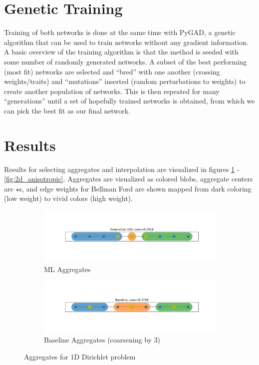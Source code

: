 \documentclass{article}
\begin{document}
\section{Genetic Training}
Training of both networks is done at the same time with PyGAD\cite{gad2021pygad}, a genetic algorithm that can be used to train networks without any gradient information.  A basic overview of the training algorithm is that the method is seeded with some number of randomly generated networks. A subset of the best performing (most fit) networks are selected and ``bred'' with one another (crossing weights/traits) and ``mutations'' inserted (random perturbations to weights) to create another population of networks.  This is then repeated for many ``generations'' until a set of hopefully trained networks is obtained, from which we can pick the best fit as our final network.

\section{Results}
Results for selecting aggregates and interpolation are visualized in figures \ref{fig:1d_dirichlet} - \ref{fig:2d_anisotropic}.  Aggregates are visualized as colored blobs, aggregate centers are $\star$s, and edge weights for Bellman Ford are shown mapped from dark coloring (low weight) to vivid colors (high weight).

\begin{figure}[b]
  \centering
  \begin{subfigure}[b]{\textwidth}
    \centering
    \includegraphics[width=\textwidth, trim=0 80 0 70, clip]{1d_dirichlet_figures/100_agg.pdf}
    \caption{ML Aggregates}
  \end{subfigure}
  \hfill
  \begin{subfigure}[b]{\textwidth}
    \centering
    \includegraphics[width=\textwidth, trim=0 80 0 70, clip]{1d_dirichlet_figures/baseline.pdf}
    \caption{Baseline Aggregates (coarsening by 3)}
  \end{subfigure}
  \caption{Aggregates for 1D Dirichlet problem}
  \label{fig:1d_dirichlet}
\end{figure}
\end{document}
